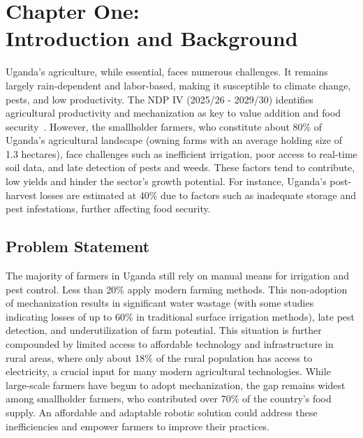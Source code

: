 \documentclass[12pt,a4paper]{report}
\begin{document}
\chapter{Chapter One: \\Introduction and Background}
Uganda's agriculture, while essential, faces numerous challenges. It remains largely rain-dependent and labor-based, making it susceptible to climate change, pests, and low productivity. The NDP IV (2025/26 - 2029/30) identifies agricultural productivity and mechanization as key to value addition and food security~\cite{uganda2024ndpiv}. However, the smallholder farmers, who constitute about 80\% of Uganda's agricultural landscape (owning farms with an average holding size of 1.3 hectares), face challenges such as inefficient irrigation, poor access to real-time soil data, and late detection of pests and weeds. These factors tend to contribute, low yields and hinder the sector's growth potential. For instance, Uganda's post-harvest losses are estimated at 40\% due to factors such as inadequate storage and pest infestations, further affecting food security.

\section{Problem Statement}
The majority of farmers in Uganda still rely on manual means for irrigation and pest control.  Less than 20\% apply modern farming methods. This non-adoption of mechanization results in significant water wastage (with some studies indicating losses of up to 60\% in traditional surface irrigation methods), late pest detection, and underutilization of farm potential. This situation is further compounded by limited access to affordable technology and infrastructure in rural areas, where only about 18\% of the rural population has access to electricity, a crucial input for many modern agricultural technologies. While large-scale farmers have begun to adopt mechanization, the gap remains widest among smallholder farmers, who contributed over 70\% of the country's food supply. An affordable and adaptable robotic solution could address these inefficiencies and empower farmers to improve their practices.
\end{document}
